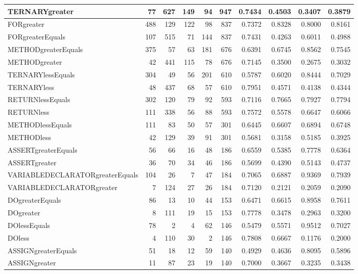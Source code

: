 \begin{appendices}
\begin{table}[htbp]
\begin{tabular}{|l|r|r|r|r|r|r|r|r|r|}
TERNARYgreater & 77 & 627 & 149 & 94 & 947 & 0.7434 & 0.4503 & 0.3407 & 0.3879 \\ \hline
FORgreater & 488 & 129 & 122 & 98 & 837 & 0.7372 & 0.8328 & 0.8000 & 0.8161 \\ \hline
FORgreaterEquals & 107 & 515 & 71 & 144 & 837 & 0.7431 & 0.4263 & 0.6011 & 0.4988 \\ \hline
METHODgreaterEquals & 375 & 57 & 63 & 181 & 676 & 0.6391 & 0.6745 & 0.8562 & 0.7545 \\ \hline
METHODgreater & 42 & 441 & 115 & 78 & 676 & 0.7145 & 0.3500 & 0.2675 & 0.3032 \\ \hline
TERNARYlessEquals & 304 & 49 & 56 & 201 & 610 & 0.5787 & 0.6020 & 0.8444 & 0.7029 \\ \hline
TERNARYless & 48 & 437 & 68 & 57 & 610 & 0.7951 & 0.4571 & 0.4138 & 0.4344 \\ \hline
RETURNlessEquals & 302 & 120 & 79 & 92 & 593 & 0.7116 & 0.7665 & 0.7927 & 0.7794 \\ \hline
RETURNless & 111 & 338 & 56 & 88 & 593 & 0.7572 & 0.5578 & 0.6647 & 0.6066 \\ \hline
METHODlessEquals & 111 & 83 & 50 & 57 & 301 & 0.6445 & 0.6607 & 0.6894 & 0.6748 \\ \hline
METHODless & 42 & 129 & 39 & 91 & 301 & 0.5681 & 0.3158 & 0.5185 & 0.3925 \\ \hline
ASSERTgreaterEquals & 56 & 66 & 16 & 48 & 186 & 0.6559 & 0.5385 & 0.7778 & 0.6364 \\ \hline
ASSERTgreater & 36 & 70 & 34 & 46 & 186 & 0.5699 & 0.4390 & 0.5143 & 0.4737 \\ \hline
VARIABLEDECLARATORgreaterEquals & 104 & 26 & 7 & 47 & 184 & 0.7065 & 0.6887 & 0.9369 & 0.7939 \\ \hline
VARIABLEDECLARATORgreater & 7 & 124 & 27 & 26 & 184 & 0.7120 & 0.2121 & 0.2059 & 0.2090 \\ \hline
DOgreaterEquals & 86 & 13 & 10 & 44 & 153 & 0.6471 & 0.6615 & 0.8958 & 0.7611 \\ \hline
DOgreater & 8 & 111 & 19 & 15 & 153 & 0.7778 & 0.3478 & 0.2963 & 0.3200 \\ \hline
DOlessEquals & 78 & 2 & 4 & 62 & 146 & 0.5479 & 0.5571 & 0.9512 & 0.7027 \\ \hline
DOless & 4 & 110 & 30 & 2 & 146 & 0.7808 & 0.6667 & 0.1176 & 0.2000 \\ \hline
ASSIGNgreaterEquals & 51 & 18 & 12 & 59 & 140 & 0.4929 & 0.4636 & 0.8095 & 0.5896 \\ \hline
ASSIGNgreater & 11 & 87 & 23 & 19 & 140 & 0.7000 & 0.3667 & 0.3235 & 0.3438 \\ \hline

\end{tabular}
\end{table}
\end{appendices}
